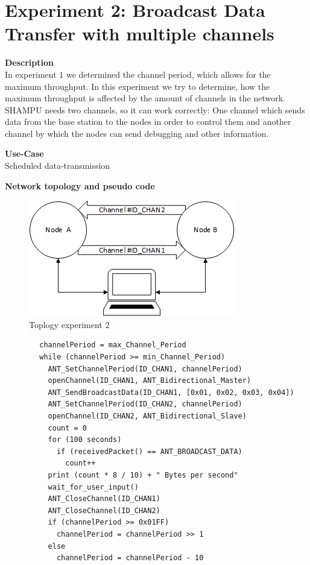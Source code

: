 \section{Experiment 2: Broadcast Data Transfer with multiple channels}
\begin{description} 
	\item{\textbf{Description}} \hfill \\ In experiment 1 we determined the channel period, which allows for the maximum throughput. In this experiment we try to determine, how the maximum throughput is affected by the amount of channels in the network. SHAMPU needs two channels, so it can work correctly: One channel which sends data from the base station to the nodes in order to control them and another channel by which the nodes can send debugging and other information.
	\item{\textbf{Use-Case}} \hfill \\ Scheduled data-transmission	
	\item{\textbf{Network topology and pseudo code}} \hfill
	\begin{figure}[H]
		\centering
		\includegraphics[scale=1]{content/images/exp2_topo.png}
		\caption{Toplogy experiment 2}
	\end{figure}
	\begin{code}[H]
		\begin{verbatim}
		channelPeriod = max_Channel_Period
		while (channelPeriod >= min_Channel_Period) 
		  ANT_SetChannelPeriod(ID_CHAN1, channelPeriod)
		  openChannel(ID_CHAN1, ANT_Bidirectional_Master)
		  ANT_SendBroadcastData(ID_CHAN1, [0x01, 0x02, 0x03, 0x04])
		  ANT_SetChannelPeriod(ID_CHAN2, channelPeriod)
		  openChannel(ID_CHAN2, ANT_Bidirectional_Slave)
		  count = 0
		  for (100 seconds) 
		    if (receivedPacket() == ANT_BROADCAST_DATA)
		      count++			
		  print (count * 8 / 10) + " Bytes per second"
		  wait_for_user_input()
		  ANT_CloseChannel(ID_CHAN1)
		  ANT_CloseChannel(ID_CHAN2)
		  if (channelPeriod >= 0x01FF)
		    channelPeriod = channelPeriod >> 1
		  else
		    channelPeriod = channelPeriod - 10
		 \end{verbatim}
		\caption{Broadcast data transfer two channels (Master)}\label{lst:mExp2}
	\end{code}
	

\end{description}

